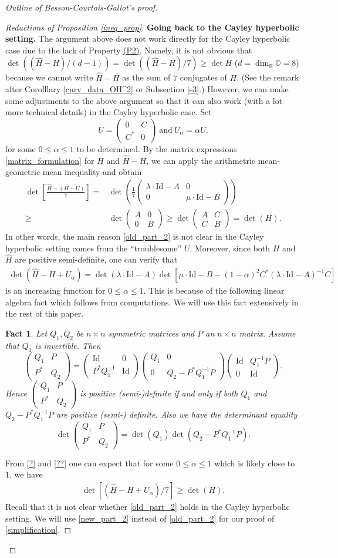 \documentclass{article}
\newcommand{\OO}{\mathbb{O}}
\newcommand{\RR}{\mathbb{R}}
\newcommand{\id}{\mathrm{Id}}
\newcommand{\matii}[2]{\left(\begin{array}{cc} #1\\#2\end{array}\right)}
\newtheorem{fact}[thm]{Fact}
\theoremstyle{definition}
\begin{document}
\begin{proof}[Outline of Besson-Courtois-Gallot's proof]
\begin{proof}[Reductions of Proposition \ref{ineq_prop}]
\textbf{Going back to the Cayley hyperbolic setting.} The argument above does not work directly for the Cayley hyperbolic case due to the lack of Property \hyperlink{P2}{(P2)}. Namely, it is not obvious that $\det((\widehat{H}-H)/(d-1))=\det((\widehat{H}-H)/7)\geq\det H$ ($d=\dim_\RR\OO=8$) because we cannot write $\widehat{H}-H$ as the sum of $7$ conjugates of $H$. (See the remark after Corolllary \ref{curv_data_OH^2} or Subsection \ref{s3}.) However, we can make some adjustments to the above argument so that it can also work (with a lot more technical details) in the Cayley hyperbolic case. Set 
$$U=\matii{0&C}{C^*&0}\mathrm{~and~}U_\alpha=\alpha U.$$
for some $0\leq \alpha\leq1$ to be determined. By the matrix expressions \eqref{matrix_formulation} for $H$ and $\widehat H-H$, we can apply the arithmetric mean-geometric mean inequality and obtain
\begin{align}\label{?}\det\left[\frac{\widehat H-(H-U)}{7}\right]=&\det\left(\frac{1}{7}\matii{\lambda\cdot\id-A&0}{0&\mu\cdot\id-B}\right) \nonumber\\
\geq&\det\matii{A&0}{0& B}\geq\det\matii{A&C}{C& B}=\det(H).
\end{align}
In other words, the main reason \eqref{old_part_2} is not clear in the Cayley hyperbolic setting comes from the ``troublesome'' $U$. Moreover, since both $H$ and $\widehat H$ are positive semi-definite, one can verify that 
\begin{align}\label{??}\det(\widehat H-H+U_\alpha)=\det(\lambda\cdot\id-A)\det[\mu\cdot\id-B-(1-\alpha)^2C^*(\lambda\cdot\id-A)^{-1}C]\end{align} 
is an increasing function for $0\leq \alpha\leq 1$. This is because of the following linear algebra fact which follows from computations. We will use this fact extensively in the rest of this paper.
\begin{fact}\label{FACT}
Let $Q_1, Q_2$ be $n\times n$ symmetric matrices and $P$ an $n\times n$ matrix. Assume that $Q_1$ is invertible. Then
$$\matii{Q_1& P}{P^*& Q_2}=\matii{\id&0}{P^*Q_1^{-1}&\id}\matii{Q_1&0}{0&Q_2-P^*Q_1^{-1}P}\matii{\id&Q_1^{-1}P}{0&\id}.$$
Hence $\matii{Q_1& P}{P^*& Q_2}$ is positive (semi-)definite if and only if both $Q_1$ and $Q_2-P^*Q_1^{-1}P$ are positive (semi-) definite. Also we have the determinant equality
$$\det\matii{Q_1& P}{P^*& Q_2}=\det(Q_1)\det(Q_2-P^*Q_1^{-1}P).$$
\end{fact}
From \eqref{?} and \eqref{??} one can expect that for some $0\leq \alpha\leq 1$ which is likely close to $1$, we have
\begin{align}\label{new_part_2}
\det[(\widehat{H}-H+U_\alpha)/7]\geq \det(H).
\end{align}
Recall that it is not clear whether \eqref{old_part_2} holds in the Cayley hyperbolic setting. We will use \eqref{new_part_2} instead of \eqref{old_part_2} for our proof of \eqref{simplification}. 


\end{proof}
\end{proof}
\end{document}

